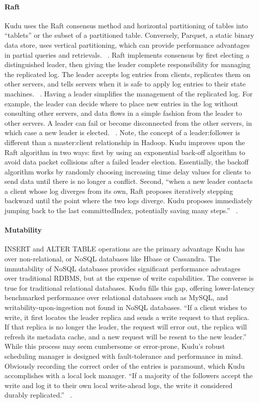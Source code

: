 \paragraph{Raft} Kudu uses the Raft consensus method and horizontal partitioning of tables into ``tablets'' or the subset of a partitioned table. Conversely, Parquet, a static binary data store, uses vertical partitioning, which can provide performance advantages in partial queries and retrievals. ~\cite{hid-sp18-407-benchmarking-kudu}. Raft implements consensus by first electing a distinguished leader, then giving the leader complete responsibility for managing the replicated log. The leader accepts log entries from clients, replicates them on other servers, and tells servers when it is safe to apply log entries to their state machines. ~\cite{hid-sp18-407-raft-algo}. Having a leader simplifies the management of the replicated log. For example, the leader can decide where to place new entries in the log without consulting other servers, and data flows in a simple fashion from the leader to other servers. A leader can fail or become disconnected from the other servers, in which case a new leader is elected. ~\cite{hid-sp18-407-raft-algo}. Note, the concept of a leader:follower is different than a master:client relationship in Hadoop. Kudu improves upon the Raft algorithm in two ways: first by using an exponential back-off algorithm to avoid data packet collisions after a failed leader election. Essentially, the backoff algorithm works by randomly choosing increasing time delay values for clients to send data until there is no longer a conflict. Second, ``when a new leader contacts a client whose log diverges from its own, Raft proposes iteratively stepping backward until the point where the two logs diverge. Kudu proposes immediately jumping back to the last committedIndex, potentially saving many steps.'' ~\cite{hid-sp18-407-kudu-intro}.
\paragraph{Mutability} INSERT and ALTER TABLE operations are the primary advantage Kudu has over non-relational, or NoSQL databases like Hbase or Cassandra. The immutability of NoSQL databases provides significant performance advatages over traditional RDBMS, but at the expense of write capabilities. The converse is true for traditional relational databases.  Kudu fills this gap, offering lower-latency benchmarked performance over relational databases such as MySQL, and writability-upon-ingestion not found in NoSQL databases. ``If a client wishes to write, it first locates the leader replica and sends a write request to that replica. If that replica is no longer the leader, the request will error out, the replica will refresh its metadata cache, and a new request will be resent to the new leader.'' ~\cite{hid-sp18-407-kudu-intro} While this process may seem cumbersome or error-prone, Kudu's robust scheduling manager is designed with fault-tolerance and performance in mind. Obviously recording the correct order of the entries is paramount, which Kudu accomplishes with a local lock manager. ``If a majority of the followers accept the write and log it to their own local write-ahead logs, the write it considered durably replicated.'' ~\cite{hid-sp18-407-kudu-intro}.

